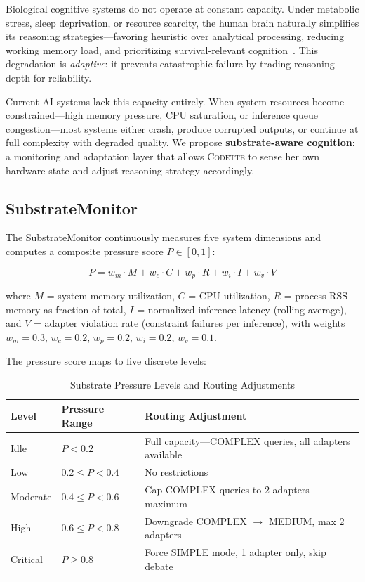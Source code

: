 \documentclass[11pt,a4paper]{article}
\newcommand{\codette}{\textsc{Codette}}
\begin{document}
Biological cognitive systems do not operate at constant capacity. Under
metabolic stress, sleep deprivation, or resource scarcity, the human brain
naturally simplifies its reasoning strategies---favoring heuristic over
analytical processing, reducing working memory load, and prioritizing
survival-relevant cognition~\citep{kahneman2011thinking}. This degradation is
\emph{adaptive}: it prevents catastrophic failure by trading reasoning depth
for reliability.

Current AI systems lack this capacity entirely. When system resources become
constrained---high memory pressure, CPU saturation, or inference queue
congestion---most systems either crash, produce corrupted outputs, or
continue at full complexity with degraded quality. We propose
\textbf{substrate-aware cognition}: a monitoring and adaptation layer that
allows \codette{} to sense her own hardware state and adjust reasoning strategy
accordingly.

\subsection{SubstrateMonitor}

The SubstrateMonitor continuously measures five system dimensions and computes
a composite pressure score $P \in [0, 1]$:

\begin{equation}
P = w_m \cdot M + w_c \cdot C + w_p \cdot R + w_i \cdot I + w_v \cdot V
\label{eq:pressure}
\end{equation}

where $M$ = system memory utilization, $C$ = CPU utilization, $R$ = process
RSS memory as fraction of total, $I$ = normalized inference latency (rolling
average), and $V$ = adapter violation rate (constraint failures per inference),
with weights $w_m = 0.3$, $w_c = 0.2$, $w_p = 0.2$, $w_i = 0.2$, $w_v = 0.1$.

The pressure score maps to five discrete levels:

\begin{table}[H]
\centering
\caption{Substrate Pressure Levels and Routing Adjustments}
\label{tab:pressure-levels}
\begin{tabular}{llp{6.5cm}}
\toprule
\textbf{Level} & \textbf{Pressure Range} & \textbf{Routing Adjustment} \\
\midrule
Idle     & $P < 0.2$ & Full capacity---COMPLEX queries, all adapters available \\
Low      & $0.2 \leq P < 0.4$ & No restrictions \\
Moderate & $0.4 \leq P < 0.6$ & Cap COMPLEX queries to 2 adapters maximum \\
High     & $0.6 \leq P < 0.8$ & Downgrade COMPLEX $\to$ MEDIUM, max 2 adapters \\
Critical & $P \geq 0.8$ & Force SIMPLE mode, 1 adapter only, skip debate \\
\bottomrule
\end{tabular}
\end{table}
\end{document}
